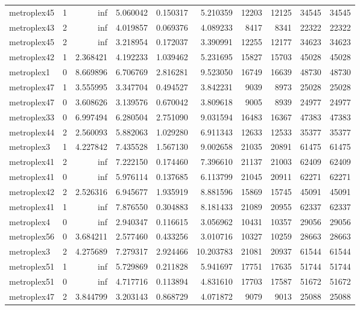 \begin{longtable}{|l|r|r|r|r|r|r|r|r|r|}
metroplex45 & 1 & inf & 5.060042 & 0.150317 & 5.210359 & 12203 & 12125 & 34545 & 34545 \\
metroplex43 & 2 & inf & 4.019857 & 0.069376 & 4.089233 & 8417 & 8341 & 22322 & 22322 \\
metroplex45 & 2 & inf & 3.218954 & 0.172037 & 3.390991 & 12255 & 12177 & 34623 & 34623 \\
metroplex42 & 1 & 2.368421 & 4.192233 & 1.039462 & 5.231695 & 15827 & 15703 & 45028 & 45028 \\
metroplex1 & 0 & 8.669896 & 6.706769 & 2.816281 & 9.523050 & 16749 & 16639 & 48730 & 48730 \\
metroplex47 & 1 & 3.555995 & 3.347704 & 0.494527 & 3.842231 & 9039 & 8973 & 25028 & 25028 \\
metroplex47 & 0 & 3.608626 & 3.139576 & 0.670042 & 3.809618 & 9005 & 8939 & 24977 & 24977 \\
metroplex33 & 0 & 6.997494 & 6.280504 & 2.751090 & 9.031594 & 16483 & 16367 & 47383 & 47383 \\
metroplex44 & 2 & 2.560093 & 5.882063 & 1.029280 & 6.911343 & 12633 & 12533 & 35377 & 35377 \\
metroplex3 & 1 & 4.227842 & 7.435528 & 1.567130 & 9.002658 & 21035 & 20891 & 61475 & 61475 \\
metroplex41 & 2 & inf & 7.222150 & 0.174460 & 7.396610 & 21137 & 21003 & 62409 & 62409 \\
metroplex41 & 0 & inf & 5.976114 & 0.137685 & 6.113799 & 21045 & 20911 & 62271 & 62271 \\
metroplex42 & 2 & 2.526316 & 6.945677 & 1.935919 & 8.881596 & 15869 & 15745 & 45091 & 45091 \\
metroplex41 & 1 & inf & 7.876550 & 0.304883 & 8.181433 & 21089 & 20955 & 62337 & 62337 \\
metroplex4 & 0 & inf & 2.940347 & 0.116615 & 3.056962 & 10431 & 10357 & 29056 & 29056 \\
metroplex56 & 0 & 3.684211 & 2.577460 & 0.433256 & 3.010716 & 10327 & 10259 & 28663 & 28663 \\
metroplex3 & 2 & 4.275689 & 7.279317 & 2.924466 & 10.203783 & 21081 & 20937 & 61544 & 61544 \\
metroplex51 & 1 & inf & 5.729869 & 0.211828 & 5.941697 & 17751 & 17635 & 51744 & 51744 \\
metroplex51 & 0 & inf & 4.717716 & 0.113894 & 4.831610 & 17703 & 17587 & 51672 & 51672 \\
metroplex47 & 2 & 3.844799 & 3.203143 & 0.868729 & 4.071872 & 9079 & 9013 & 25088 & 25088 \\

\end{longtable}

